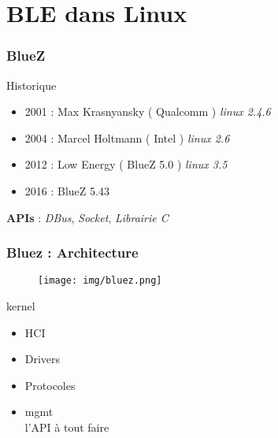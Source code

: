 \section{BLE dans Linux}

\begin{frame}
	\frametitle{BlueZ}
	\begin{block}{Historique}
		\begin{itemize}
			\item 2001 : Max Krasnyansky ( Qualcomm ) {\small{\textit{linux 2.4.6}}}
			\item 2004 : Marcel Holtmann ( Intel ) {\small{\textit{linux 2.6}}}
			\item 2012 : Low Energy ( BlueZ 5.0 ) {\small{\textit{linux 3.5}}}
			\item 2016 : BlueZ 5.43
		\end{itemize}
	\end{block}

	\vspace{1cm}
	\textbf{APIs} : \textit{DBus}, \textit{Socket}, \textit{Librairie C}
\end{frame}

\begin{frame}
	\frametitle{Bluez : Architecture}
	\begin{minipage}{0.50\linewidth}
	\begin{figure}
		\texttt{[image: img/bluez.png]}
	\end{figure}
	\end{minipage}
	\begin{minipage}{0.32\linewidth}
		\begin{block}{kernel}
			\begin{itemize}
				\item HCI
				\item Drivers
				\item Protocoles
				\item mgmt \\ {\small{l'API à tout faire}}
			\end{itemize}
		\end{block}
	\end{minipage}
\end{frame}

